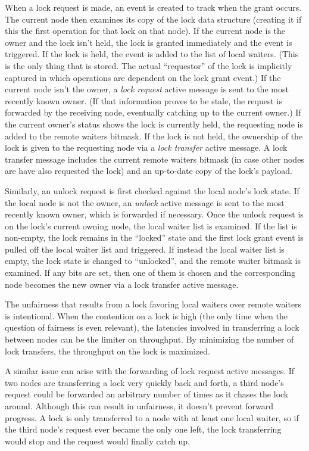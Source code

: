 When a lock request is made, an event is created to track when the grant occurs.  The current node then
examines its copy of the lock data structure (creating it if
this the first operation for that lock on that node).  If the current node is the owner and the lock isn't
held, the lock is granted immediately and the event is triggered.  If the lock is held, the event is added
to the list of local waiters.  (This is the only thing that is stored.  The actual ``requestor'' of the lock
is implicitly captured in which operations are dependent on the lock grant event.)  If the current node
isn't the owner, a {\em lock request} active message is
sent to the most recently known owner.  (If that information proves to be stale, the request is forwarded
by the receiving node, eventually catching up to the current owner.)  If the current owner's status shows
the lock is currently held, the requesting node is added to the remote waiters bitmask.  If the lock is
not held, the ownership of the lock is given to the requesting node via a {\em lock transfer} active
message.  A lock transfer message includes the current remote waiters bitmask (in case other nodes are
have also requested the lock) and an up-to-date copy of the lock's payload.

Similarly, an unlock request is first checked against the local node's lock state.  If the local node is
not the owner, an {\em unlock} active message is sent to the most recently known owner, which is forwarded
if necessary.  Once the unlock request is on the lock's current owning node, the local waiter list is
examined.  If the list is non-empty, the lock remains in the ``locked'' state and the first lock grant
event is pulled off the local waiter list and triggered.  If instead the local waiter list is empty, the
lock state is changed to ``unlocked'', and the remote waiter bitmask is examined.  If any bits are set, then
one of them is chosen and the corresponding node becomes the new owner via a lock transfer active message.

The unfairness that results from a lock favoring local waiters over remote waiters is intentional.  When the
contention on a lock is high (the only time when the question of fairness is even relevant), the latencies
involved in transferring a lock between nodes can be the limiter on throughput.  By minimizing the number
of lock transfers, the throughput on the lock is maximized.

A similar issue can arise with the forwarding of lock request active messages.  If two nodes are
transferring a lock very quickly back and forth, a third node's request could be forwarded an arbitrary
number of times as it chases the lock around.  Although this can result in unfairness, it doesn't 
prevent forward progress.  A lock is only transferred to a node with at least one local waiter, so if 
the third node's request ever became the only one left, the lock transferring would stop and the request
would finally catch up.

